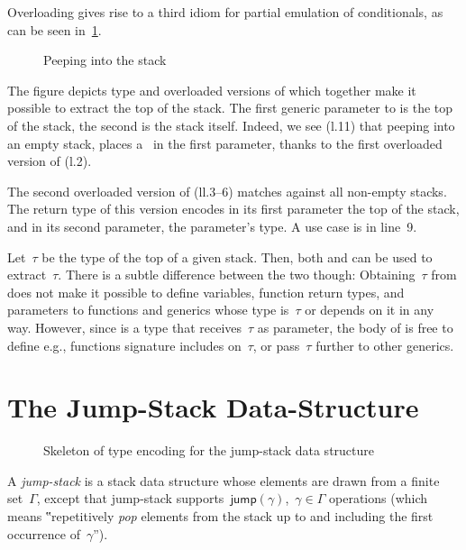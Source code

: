 \documentclass[a4paper,USenglish]{lipics-v2016}
\def\ReplaceInThesis#1#2{#1}
\begin{document}
Overloading gives rise to a third idiom for partial emulation of conditionals, as can be seen
  in~\cref{Figure:peep}.

\begin{figure}[htb]  \caption{Peeping into the stack}  \label{Figure:peep}  \lstset{style=numbered}
\end{figure}

The figure depicts type  and overloaded versions of  which 
      together make it possible to extract the top of the stack.
The first generic parameter to  is the top of the stack, the second is the stack itself.
Indeed, we see (l.11) that peeping into an empty stack, places a~
  in the first parameter, thanks to the first overloaded version of  (l.2).

The second overloaded version of  (ll.3--6) matches
 against all non-empty stacks. 
The return type
 of this version encodes
 in its first parameter
 the top of the stack, and 
  in its second parameter, the parameter's type.
A use case is in line~9.

Let~$τ$ be the type of the top of a given stack.
Then, both  and  can be used to extract~$τ$.
There is a subtle difference between the two though:
Obtaining~$τ$ from  does
  not make it possible to define variables, function return types, and
  parameters to functions and generics whose type is~$τ$ or depends on it in any way.
However, since  is a type that receives~$τ$ as parameter,
  the body of  is free to define e.g., functions signature includes on~$τ$,
  or pass~$τ$ further to other generics.
 
\section{The Jump-Stack Data-Structure}
\label{section:jump}
\ReplaceInThesis{\begin{wrapfigure}[19]{r}{44ex}
  \caption{Skeleton of type encoding for the jump-stack data structure}  \label{Figure:jump}  \javaInput[minipage,listing style=numbered]{jump-stack.listing}
\end{wrapfigure}
}{  \begin{figure}[ht]
  \caption{Skeleton of type encoding for the jump-stack data structure}  \label{Figure:jump}  \javaInput[minipage,listing style=numbered,width=\linewidth]{jump-stack.listing}
\end{figure}
}
A \emph{jump-stack} is a stack data structure whose elements are drawn from a finite set~$Γ$,
  except that jump-stack supports~$\textsf{jump}(γ)$,~$γ∈Γ$ operations
  (which means ‟repetitively \emph{pop} elements from the stack up
  to and including the first occurrence of~$γ$”).
\end{document}
